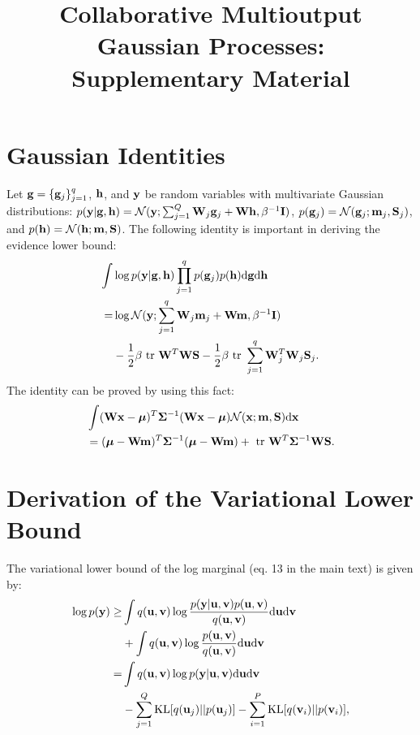 \documentclass[]{article}
\title{Collaborative Multioutput Gaussian Processes: \\ Supplementary Material}
\author{} %
\begin{document}
\maketitle

\section{Gaussian Identities}
Let $\mathbf{g} = \{\mathbf{g}_j\}_{j=1}^q$, $\mathbf{h}$, and $\mathbf{y}$ be random variables with multivariate Gaussian distributions: 
$p(\mathbf{y} | \mathbf{g}, \mathbf{h}) = \mathcal{N}(\mathbf{y}; \sum_{j=1}^Q \mathbf{W}_j \mathbf{g}_j + \mathbf{W} \mathbf{h}, \beta^{-1} \mathbf{I})$, $p(\mathbf{g}_j) = \mathcal{N}(\mathbf{g}_j; \mathbf{m}_j, \mathbf{S}_j)$, and $p(\mathbf{h}) = \mathcal{N}(\mathbf{h}; \mathbf{m}, \mathbf{S})$.
The following identity is important in deriving the evidence lower bound:
\begin{align}
\nonumber
\int& \log p(\y | \g, \h) \prod_{j=1}^q p(\g_j) p(\h) \der \g \der \h \\
\nonumber
=& \log \Normal(\y; \sum_{j=1}^q \W_j \m_j + \W \m, \beta^{-1} \I) \\
& - \frac{1}{2} \beta \trace \W^T \W \S - \frac{1}{2} \beta \trace \sum_{j=1}^q \W_j^T \W_j \S_j.
 \label{eq:identity}
\end{align}
The identity can be proved by using this fact: 
\begin{align}
\nonumber
&\int (\mathbf{W}\mathbf{x} - \boldsymbol{\mu})^T \mathbf{\Sigma}^{-1} (\mathbf{W} \mathbf{x} - \boldsymbol{\mu}) \mathcal{N}(\mathbf{x}; \mathbf{m}, \mathbf{S}) \mathrm{d} \mathbf{x} \\
&= (\boldsymbol{\mu} - \mathbf{W}\mathbf{m})^T \mathbf{\Sigma}^{-1} (\boldsymbol{\mu} - \mathbf{W}\mathbf{m}) + \mbox{ \rm tr } \mathbf{W}^T \mathbf{\Sigma}^{-1} \mathbf{W} \mathbf{S}.
\end{align}


\section{Derivation of the Variational Lower Bound}
The variational lower bound of the log marginal (eq. 13 in the main text) is given by:
\begin{align}
\nonumber
\log p(\mathbf{y}) \ge& \int q(\mathbf{u}, \mathbf{v}) \log \frac{p(\mathbf{y} | \mathbf{u}, \mathbf{v}) p(\mathbf{u}, \mathbf{v})}{q(\mathbf{u}, \mathbf{v})} \mathrm{d} \mathbf{u} \mathrm{d} \mathbf{v} \\
\nonumber
&+ \int q(\mathbf{u}, \mathbf{v}) \log \frac{p(\mathbf{u}, \mathbf{v})}{q(\mathbf{u}, \mathbf{v})} \mathrm{d} \mathbf{u} \mathrm{d} \mathbf{v} \\
\nonumber
=& \int q(\mathbf{u}, \mathbf{v}) \log p(\mathbf{y} | \mathbf{u}, \mathbf{v})  \mathrm{d} \mathbf{u} \mathrm{d} \mathbf{v} \\
\nonumber
&- \sum_{j=1}^Q \text{KL}[q(\mathbf{u}_j) || p(\mathbf{u}_j)] - \sum_{i=1}^P \text{KL}[q(\mathbf{v}_i) || p(\mathbf{v}_i)],
\end{align}
\end{document}
